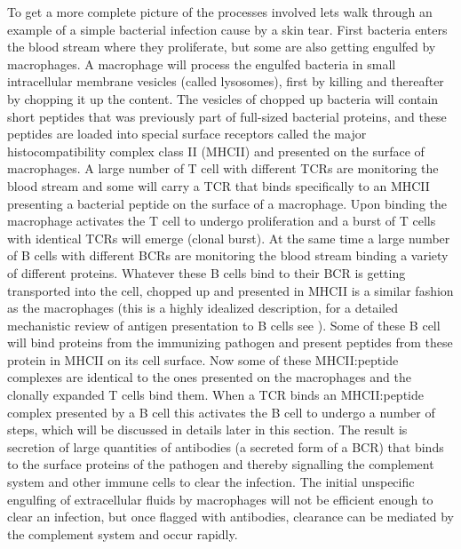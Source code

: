 To get a more complete picture of the processes involved lets walk through an example of a simple bacterial infection cause by a skin tear.
First bacteria enters the blood stream where they proliferate, but some are also getting engulfed by macrophages.
A macrophage will process the engulfed bacteria in small intracellular membrane vesicles (called lysosomes), first by killing and thereafter by chopping it up the content.
The vesicles of chopped up bacteria will contain short peptides that was previously part of full-sized bacterial proteins, and these peptides are loaded into special surface receptors called the major histocompatibility complex class II (MHCII) and presented on the surface of macrophages.
A large number of T cell with different TCRs are monitoring the blood stream and some will carry a TCR that binds specifically to an MHCII presenting a bacterial peptide on the surface of a macrophage.
Upon binding the macrophage activates the T cell to undergo proliferation and a burst of T cells with identical TCRs will emerge (clonal burst).
At the same time a large number of B cells with different BCRs are monitoring the blood stream binding a variety of different proteins.
Whatever these B cells bind to their BCR is getting transported into the cell, chopped up and presented in MHCII is a similar fashion as the macrophages (this is a highly idealized description, for a detailed mechanistic review of antigen presentation to B cells see \cite{batista2009and}).
Some of these B cell will bind proteins from the immunizing pathogen and present peptides from these protein in MHCII on its cell surface.
Now some of these MHCII:peptide complexes are identical to the ones presented on the macrophages and the clonally expanded T cells bind them.
When a TCR binds an MHCII:peptide complex presented by a B cell this activates the B cell to undergo a number of steps, which will be discussed in details later in this section.
The result is secretion of large quantities of antibodies (a secreted form of a BCR) that binds to the surface proteins of the pathogen and thereby signalling the complement system and other immune cells to clear the infection.
The initial unspecific engulfing of extracellular fluids by macrophages will not be efficient enough to clear an infection, but once flagged with antibodies, clearance can be mediated by the complement system and occur rapidly.

